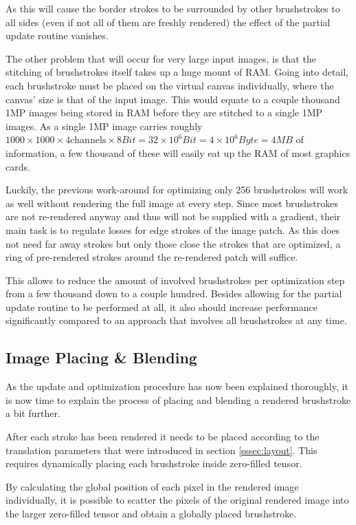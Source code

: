 As this will cause the border strokes to be surrounded by other brushstrokes to all sides (even if not all of them are freshly rendered) the effect of the partial update routine vanishes.

The other problem that will occur for very large input images, is that the stitching of brushstrokes itself takes up a huge mount of RAM.
Going into detail, each brushstroke must be placed on the virtual canvas individually,  where the canvas' size is that of the input image.
This would equate to a couple thousand 1MP images being stored in RAM before they are stitched to a single 1MP images.
As a single 1MP image carries roughly $1000 \times 1000 \times 4 \text{channels} \times 8 Bit = 32 \times 10^{6} Bit = 4 \times 10^{6} Byte = 4 MB$ of information, a few thousand of these will easily eat up the RAM of most graphics cards.

Luckily, the previous work-around for optimizing only 256 brushstrokes will work as well without rendering the full image at every step.
Since most brushstrokes are not re-rendered anyway and thus will not be supplied with a gradient, their main task is to regulate losses for edge strokes of the image patch.
As this does not need far away strokes but only those close the strokes that are optimized, a ring of pre-rendered strokes around the re-rendered patch will suffice.

This allows to reduce the amount of involved brushstrokes per optimization step from a few thousand down to a couple hundred.
Besides allowing for the partial update routine to be performed at all, it also should increase performance significantly compared to an approach that involves all brushstrokes at any time.

\subsection{Image Placing \& Blending}
As the update and optimization procedure has now been explained thoroughly, it is now time to explain the process of placing and blending a rendered brushstroke a bit further.

After each stroke has been rendered it needs to be placed according to the translation parameters that were introduced in section \ref{sssec:layout}.
This requires dynamically placing each brushstroke inside zero-filled tensor.

By calculating the global position of each pixel in the rendered image individually, it is possible to scatter the pixels of the original rendered image into the larger zero-filled tensor and obtain a globally placed brushstroke.

